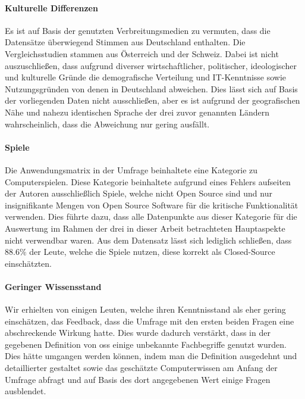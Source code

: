 \documentclass[a4paper]{article}
\begin{document}
            \paragraph{Kulturelle Differenzen}
                Es ist auf Basis der genutzten Verbreitungsmedien zu vermuten, dass die Datensätze überwiegend Stimmen aus Deutschland enthalten. Die Vergleichsstudien stammen aus Österreich\cite{demographicDistributionKnowledge} und der Schweiz\cite{oss:studie}. Dabei ist nicht auszuschließen, dass aufgrund diverser wirtschaftlicher, politischer, ideologischer und kulturelle Gründe die demografische Verteilung und IT-Kenntnisse sowie Nutzungsgründen von denen in Deutschland abweichen. Dies lässt sich auf Basis der vorliegenden Daten nicht ausschließen, aber es ist aufgrund der geografischen Nähe und nahezu identischen Sprache der drei zuvor genannten Ländern wahrscheinlich, dass die Abweichung nur gering ausfällt.
                
            \paragraph{Spiele}
                Die Anwendungsmatrix in der Umfrage beinhaltete eine Kategorie zu Computerspielen. Diese Kategorie beinhaltete aufgrund eines Fehlers aufseiten der Autoren ausschließlich Spiele, welche nicht Open Source sind und nur insignifikante Mengen von Open Source Software für die kritische Funktionalität verwenden. Dies führte dazu, dass alle Datenpunkte aus dieser Kategorie für die Auswertung im Rahmen der drei in dieser Arbeit betrachteten Hauptaspekte nicht verwendbar waren. Aus dem Datensatz lässt sich lediglich schließen, dass $88.6\%$ der Leute, welche die Spiele nutzen, diese korrekt als Closed-Source einschätzten.
                
            \paragraph{Geringer Wissensstand}
                Wir erhielten von einigen Leuten, welche ihren Kenntnisstand als eher gering einschätzen, das Feedback, dass die Umfrage mit den ersten beiden Fragen eine abschreckende Wirkung hatte. Dies wurde dadurch verstärkt, dass in der gegebenen Definition von \gls{oss} einige unbekannte Fachbegriffe genutzt wurden. Dies hätte umgangen werden können, indem man die Definition ausgedehnt und detaillierter gestaltet sowie das geschätzte Computerwissen am Anfang der Umfrage abfragt und auf Basis des dort angegebenen Wert einige Fragen ausblendet.
            
\end{document}
